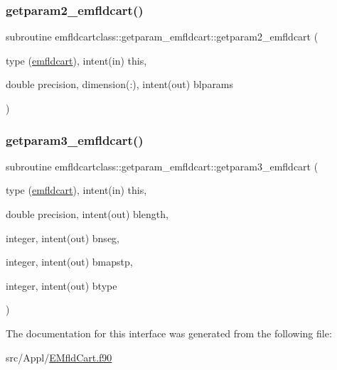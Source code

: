 \mbox{\label{interfaceemfldcartclass_1_1getparam__emfldcart_a46024264d488df4a38e0bf76feda2430}} 
\subsubsection{\texorpdfstring{getparam2\_emfldcart()}{getparam2\_emfldcart()}}
{\footnotesize\ttfamily subroutine emfldcartclass\+::getparam\+\_\+emfldcart\+::getparam2\+\_\+emfldcart (\begin{DoxyParamCaption}\item[{type (\mbox{\hyperlink{namespaceemfldcartclass_structemfldcartclass_1_1emfldcart}{emfldcart}}), intent(in)}]{this,  }\item[{double precision, dimension(\+:), intent(out)}]{blparams }\end{DoxyParamCaption})}

\mbox{\label{interfaceemfldcartclass_1_1getparam__emfldcart_ac0654b403917d66c45c4bdb51d8ea727}} 
\subsubsection{\texorpdfstring{getparam3\_emfldcart()}{getparam3\_emfldcart()}}
{\footnotesize\ttfamily subroutine emfldcartclass\+::getparam\+\_\+emfldcart\+::getparam3\+\_\+emfldcart (\begin{DoxyParamCaption}\item[{type (\mbox{\hyperlink{namespaceemfldcartclass_structemfldcartclass_1_1emfldcart}{emfldcart}}), intent(in)}]{this,  }\item[{double precision, intent(out)}]{blength,  }\item[{integer, intent(out)}]{bnseg,  }\item[{integer, intent(out)}]{bmapstp,  }\item[{integer, intent(out)}]{btype }\end{DoxyParamCaption})}



The documentation for this interface was generated from the following file\+:\begin{DoxyCompactItemize}
\item 
src/\+Appl/\mbox{\hyperlink{_e_mfld_cart_8f90}{E\+Mfld\+Cart.\+f90}}\end{DoxyCompactItemize}
